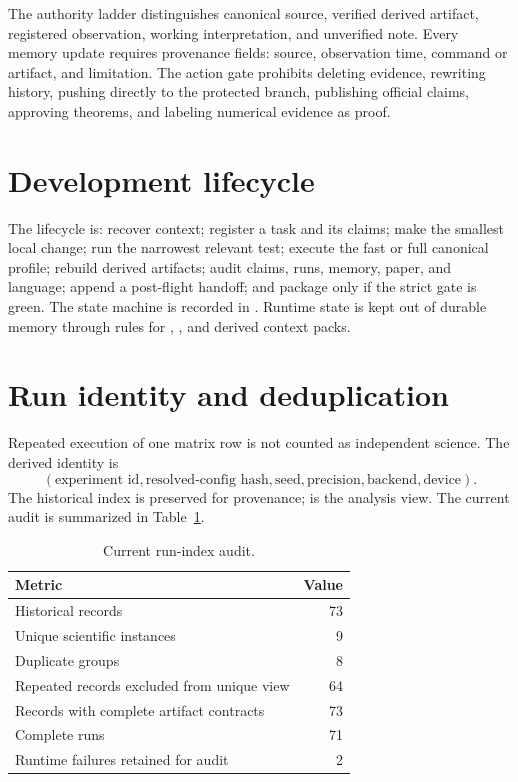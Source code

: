 \documentclass[11pt]{article}
\begin{document}
The authority ladder distinguishes canonical source, verified derived artifact, registered observation, working interpretation, and unverified note. Every memory update requires provenance fields: source, observation time, command or artifact, and limitation. The action gate prohibits deleting evidence, rewriting history, pushing directly to the protected branch, publishing official claims, approving theorems, and labeling numerical evidence as proof.

\section{Development lifecycle}

The lifecycle is: recover context; register a task and its claims; make the smallest local change; run the narrowest relevant test; execute the fast or full canonical profile; rebuild derived artifacts; audit claims, runs, memory, paper, and language; append a post-flight handoff; and package only if the strict gate is green. The state machine is recorded in . Runtime state is kept out of durable memory through  rules for , , and derived context packs.

\section{Run identity and deduplication}

Repeated execution of one matrix row is not counted as independent science. The derived identity is
\[
 (\text{experiment id},\text{resolved-config hash},\text{seed},
   \text{precision},\text{backend},\text{device}).
\]
The historical index is preserved for provenance;  is the analysis view. The current audit is summarized in Table~\ref{tab:runs}.

\begin{table}[t]
\centering
\small
\caption{Current run-index audit.}
\label{tab:runs}
\begin{tabular}{lr}
\toprule
Metric & Value \\
\midrule
Historical records & 73 \\
Unique scientific instances & 9 \\
Duplicate groups & 8 \\
Repeated records excluded from unique view & 64 \\
Records with complete artifact contracts & 73 \\
Complete runs & 71 \\
Runtime failures retained for audit & 2 \\
\bottomrule
\end{tabular}
\end{table}
\end{document}
